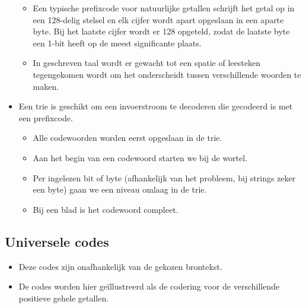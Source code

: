 \begin{itemize}
\begin{itemize}
        \item Een typische prefixcode voor natuurlijke getallen schrijft het getal op in een 128-delig stelsel en elk cijfer wordt apart opgeslaan in een aparte byte. Bij het laatste cijfer wordt er 128 opgeteld, zodat de laatste byte een 1-bit heeft op de meest significante plaats.
        \item In geschreven taal wordt er gewacht tot een spatie of leesteken tegengekomen wordt om het onderscheidt tussen verschillende woorden te maken.
    \end{itemize}
    \item Een trie is geschikt om een invoerstroom te decoderen die gecodeerd is met een prefixcode.
    \begin{itemize}
        \item Alle codewoorden worden eerst opgeslaan in de trie.
        \item Aan het begin van een codewoord starten we bij de wortel.
        \item Per ingelezen bit of byte (afhankelijk van het probleem, bij strings zeker een byte) gaan we een niveau omlaag in de trie.
        \item Bij een blad is het codewoord compleet.
    \end{itemize}
\end{itemize}

\subsection{Universele codes}
\begin{itemize}
    \item Deze codes zijn onafhankelijk van de gekozen brontekst.
    \item De codes worden hier geïllustreerd als de codering voor de verschillende positieve gehele getallen.
\end{itemize}

